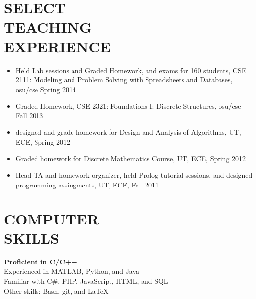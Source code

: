 \documentclass[margin, 10pt]{res}
\begin{document}
\begin{resume}
\section{SELECT \\ TEACHING \\ EXPERIENCE}
\begin{itemize}
\item Held Lab sessions and Graded Homework, and exams for 160 students, CSE 2111: Modeling and Problem Solving with Spreadsheets and Databases, osu/cse Spring 2014
\item Graded Homework, CSE 2321: Foundations I: Discrete Structures, osu/cse Fall 2013
\item designed and grade homework for Design and Analysis of Algorithms, UT, ECE, Spring 2012
\item Graded homework for  Discrete Mathematics Course, UT, ECE, Spring 2012
\item Head TA and homework organizer, held Prolog tutorial sessions, and designed programming assingments, UT, ECE, Fall 2011.

\end{itemize}

\section{COMPUTER \\ SKILLS}
\textbf{Proficient in C/C++}\\
Experienced in MATLAB, Python, and Java\\
Familiar with C\#, PHP, JavaScript, HTML, and SQL\\ 
Other skills: Bash, git, and \LaTeX


\end{resume}
\end{document}
